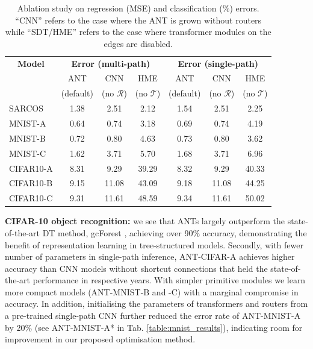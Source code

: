 \begin{table}[t]
	\caption{\footnotesize Ablation study on regression (MSE) and classification ($\%$) errors. ``CNN'' refers to the case where the ANT is grown without routers while ``SDT/HME'' refers to the case where transformer modules on the edges are disabled.} \label{tab:ablationstudy}
	\footnotesize
    \center
	\begin{tabular}{|l|ccc|ccc|}
		\hline
		\multicolumn{1}{|c}{\textbf{Model}} &  \multicolumn{3}{|c|}{\textbf{Error (multi-path)}} & \multicolumn{3}{c|}{\textbf{Error (single-path)}}  \\
			& ANT & CNN & HME & ANT & CNN & HME  \\
			& (default) & (no $\mathcal{R}$) & (no $\mathcal{T}$) & (default) & (no $\mathcal{R}$) & (no $\mathcal{T}$) \\
		\hline
		SARCOS &1.38 & 2.51 & 2.12 &1.54 & 2.51 & 2.25 \\
		MNIST-A &0.64 & 0.74 & 3.18 &0.69 & 0.74 & 4.19  \\
	    MNIST-B &0.72 & 0.80 & 4.63 &0.73 & 0.80 & 3.62\\
        MNIST-C &1.62 & 3.71 & 5.70 &1.68 & 3.71 & 6.96 \\
		CIFAR10-A &8.31 & 9.29 & 39.29   & 8.32 & 9.29 & 40.33 \\
        CIFAR10-B &9.15 & 11.08 & 43.09 & 9.18 & 11.08 & 44.25 \\
        CIFAR10-C &9.31 & 11.61 & 48.59 & 9.34 & 11.61 & 50.02 \\
		\hline
	\end{tabular}
\end{table}

\textbf{CIFAR-10 object recognition:} we see that ANTs largely outperform the state-of-the-art DT method, gcForest \cite{zhou2017deepft}, achieving over 90\% accuracy, demonstrating the benefit of representation learning in tree-structured models. Secondly, with fewer number of parameters in single-path inference, ANT-CIFAR-A achieves higher accuracy than CNN models without shortcut connections \cite{goodfellow2013maxout,lin2013network,springenberg2014striving} that held the state-of-the-art performance in respective years. With simpler primitive modules we learn more compact models (ANT-MNIST-B and -C) with a marginal compromise in accuracy. In addition, initialising the parameters of transformers and routers from a pre-trained single-path CNN further reduced the error rate of ANT-MNIST-A by 20\% (see ANT-MNIST-A* in Tab. \ref{table:mnist_results}), indicating room for improvement in our proposed optimisation method.

